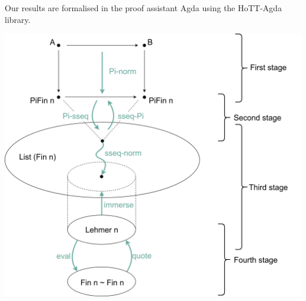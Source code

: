 Our results are formalised in the proof assistant Agda using the HoTT-Agda library.


\begin{center}
  \includegraphics[scale=0.3]{outline.png}
\end{center}


